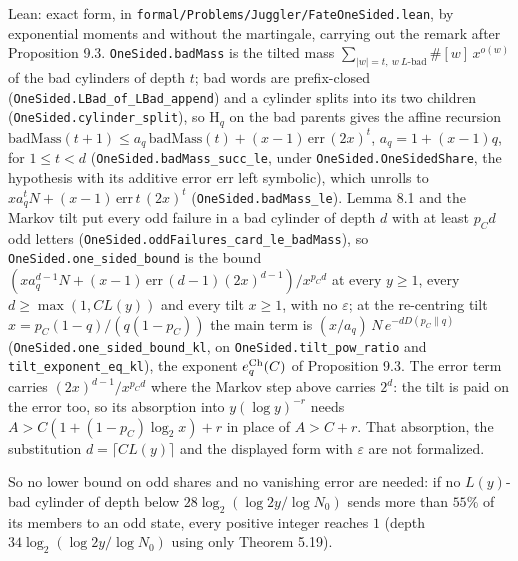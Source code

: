 \documentclass[11pt,a4paper]{article}
\begin{document}
Lean: exact form, in
\texttt{\nolinkurl{formal/Problems/Juggler/FateOneSided.lean}}, by
exponential moments and without the martingale, carrying out the remark
after Proposition 9.3. \texttt{\nolinkurl{OneSided.badMass}} is the
tilted mass \(\sum_{|w|=t,\ w\ L\text{-bad}}\#[w]\,x^{o(w)}\) of the bad
cylinders of depth \(t\); bad words are prefix-closed
(\texttt{\nolinkurl{OneSided.LBad_of_LBad_append}}) and a cylinder
splits into its two children
(\texttt{\nolinkurl{OneSided.cylinder_split}}), so \(\mathrm H_q\) on
the bad parents gives the affine recursion
\(\mathrm{badMass}(t+1)\le a_q\,\mathrm{badMass}(t)+(x-1)\,\mathrm{err}\,(2x)^t\),
\(a_q=1+(x-1)q\), for \(1\le t<d\)
(\texttt{\nolinkurl{OneSided.badMass_succ_le}}, under
\texttt{\nolinkurl{OneSided.OneSidedShare}}, the hypothesis with its
additive error \(\mathrm{err}\) left symbolic), which unrolls to
\(xa_q^{t}N+(x-1)\,\mathrm{err}\,t\,(2x)^t\)
(\texttt{\nolinkurl{OneSided.badMass_le}}). Lemma 8.1 and the Markov
tilt put every odd failure in a bad cylinder of depth \(d\) with at
least \(p_Cd\) odd letters
(\texttt{\nolinkurl{OneSided.oddFailures_card_le_badMass}}), so
\texttt{\nolinkurl{OneSided.one_sided_bound}} is the bound
\((xa_q^{d-1}N+(x-1)\,\mathrm{err}\,(d-1)(2x)^{d-1})/x^{p_Cd}\) at every
\(y\ge1\), every \(d\ge\max(1,CL(y))\) and every tilt \(x\ge1\), with no
\(\varepsilon\); at the re-centring tilt \(x=p_C(1-q)/(q(1-p_C))\) the
main term is \((x/a_q)\,N\,e^{-dD(p_C\|q)}\)
(\texttt{\nolinkurl{OneSided.one_sided_bound_kl}}, on
\texttt{\nolinkurl{OneSided.tilt_pow_ratio}} and
\texttt{\nolinkurl{tilt_exponent_eq_kl}}), the exponent
\(e^{\rm Ch}_q(C)\) of Proposition 9.3. The error term carries
\((2x)^{d-1}/x^{p_Cd}\) where the Markov step above carries \(2^d\): the
tilt is paid on the error too, so its absorption into \(y(\log y)^{-r}\)
needs \(A>C(1+(1-p_C)\log_2x)+r\) in place of \(A>C+r\). That
absorption, the substitution \(d=\lceil CL(y)\rceil\) and the displayed
form with \(\varepsilon\) are not formalized.

So no lower bound on odd shares and no vanishing error are needed: if no
\(L(y)\)-bad cylinder of depth below \(28\log_2(\log 2y/\log N_0)\)
sends more than \(55\%\) of its members to an odd state, every positive
integer reaches \(1\) (depth \(34\log_2(\log 2y/\log N_0)\) using only
Theorem 5.19).
\end{document}
